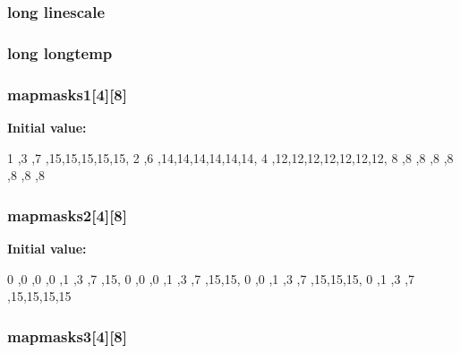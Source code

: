\hypertarget{WL__SCALE_8C_ab632e78b4009b275cfa1629ac26b4be1}{
\subsubsection[{linescale}]{\setlength{\rightskip}{0pt plus 5cm}long {\bf linescale}}}
\label{WL__SCALE_8C_ab632e78b4009b275cfa1629ac26b4be1}
\hypertarget{WL__SCALE_8C_ab21e1dd6476595095fa335682b93094e}{
\subsubsection[{longtemp}]{\setlength{\rightskip}{0pt plus 5cm}long {\bf longtemp}}}
\label{WL__SCALE_8C_ab21e1dd6476595095fa335682b93094e}
\hypertarget{WL__SCALE_8C_ac94f1a50e42c5f020505d6c1b77c4f5e}{
\subsubsection[{mapmasks1}]{ {\bf mapmasks1}\mbox{[}4\mbox{]}\mbox{[}8\mbox{]}}}
\label{WL__SCALE_8C_ac94f1a50e42c5f020505d6c1b77c4f5e}
{\bfseries Initial value:}
\begin{DoxyCode}
 {
{1 ,3 ,7 ,15,15,15,15,15},
{2 ,6 ,14,14,14,14,14,14},
{4 ,12,12,12,12,12,12,12},
{8 ,8 ,8 ,8 ,8 ,8 ,8 ,8} }
\end{DoxyCode}
\hypertarget{WL__SCALE_8C_a41f7ecdc70d7ae35ee9d6594f950d37c}{
\subsubsection[{mapmasks2}]{ {\bf mapmasks2}\mbox{[}4\mbox{]}\mbox{[}8\mbox{]}}}
\label{WL__SCALE_8C_a41f7ecdc70d7ae35ee9d6594f950d37c}
{\bfseries Initial value:}
\begin{DoxyCode}
 {
{0 ,0 ,0 ,0 ,1 ,3 ,7 ,15},
{0 ,0 ,0 ,1 ,3 ,7 ,15,15},
{0 ,0 ,1 ,3 ,7 ,15,15,15},
{0 ,1 ,3 ,7 ,15,15,15,15} }
\end{DoxyCode}
\hypertarget{WL__SCALE_8C_ab39851371b2e506e131e50d79d8550d8}{
\subsubsection[{mapmasks3}]{ {\bf mapmasks3}\mbox{[}4\mbox{]}\mbox{[}8\mbox{]}}}
